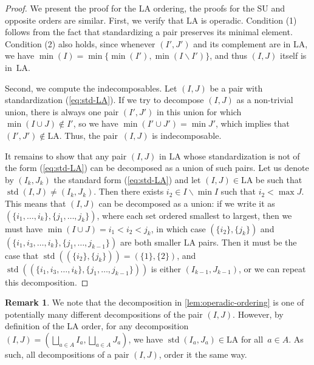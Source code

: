 \documentclass{amsart}
\theoremstyle{definition}
\newtheorem{remark}[theorem]{Remark}
\newcommand{\ssm}{\smallsetminus} %
\DeclareMathOperator{\std}{std}
\newcommand{\SU}{\mathrm{SU}}
\newcommand{\LA}{\mathrm{LA}}
\begin{document}
\begin{proof}
We present the proof for the $\LA$ ordering, the proofs for the $\SU$ and opposite orders are similar.
First, we verify that $\LA$ is operadic. 
Condition (1) follows from the fact that standardizing a pair preserves its minimal element.
Condition (2) also holds, since whenever $(I',J')$ and its complement are in $\LA$, we have $\min(I)=\min\{\min(I'),\min(I\ssm I')\}$, and thus $(I,J)$ itself is in~$\LA$.

Second, we compute the indecomposables. 
Let $(I,J)$ be a pair with standardization (\ref{eq:std-LA}).
If we try to decompose $(I,J)$ as a non-trivial union, there is always one pair $(I',J')$ in this union for which~$\min (I\cup J) \notin I'$, so we have $\min ( I' \cup J') = \min J'$, which implies that $(I',J') \notin \LA$.
Thus, the pair~$(I,J)$ is indecomposable. 

It remains to show that any pair $(I,J)$ in $\LA$ whose standardization is not of the form (\ref{eq:std-LA}) can be decomposed as a union of such pairs. 
Let us denote by $(I_k,J_k)$ the standard form (\ref{eq:std-LA}) and let $(I,J)\in \LA$ be such that $\std(I,J) \neq (I_k,J_k)$.
Then there exists $i_2 \in I\ssm \min I$ such that $i_2 < \max J$.
This means that $(I,J)$ can be decomposed as a union: if we write it as $(\{i_1,\dots,i_k\},\{j_1,\dots,j_k\})$, where each set ordered smallest to largest, then we must have $\min (I\cup J)=i_1<i_2<j_k$, in which case $(\{i_2\},\{j_k\})$ and $(\{i_1,i_3,\dots,i_k\},\{j_1,\dots,j_{k-1}\})$ are both smaller $\LA$ pairs.
Then it must be the case that $\std((\{i_2\},\{j_k\})) = (\{1\},\{2\})$, and $\std((\{i_1,i_3,\dots,i_k\},\{j_1,\dots,j_{k-1}\}))$ is either $(I_{k-1},J_{k-1})$, or we can repeat this decomposition.
\end{proof}

\begin{remark}
We note that the decomposition in \cref{lem:operadic-ordering} is one of potentially many different decompositions of the pair $(I,J)$. 
However, by definition of the $\LA$ order, for any decomposition $(I,J) = (\bigsqcup_{a\in A} I_a, \bigsqcup_{a \in A} J_a)$, we have $\std(I_a, J_a) \in \LA$ for all~$a \in A$.
As such, all decompositions of a pair $(I,J)$, order it the same way.
\end{remark}
\end{document}
